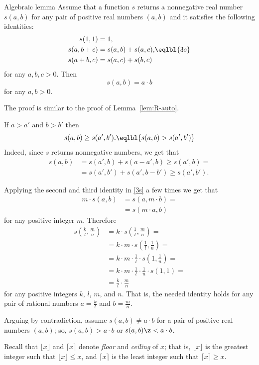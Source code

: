 \begin{thm}{Algebraic lemma}\label{lem:alg-area}
Assume that a function $s$
returns a nonnegative real number $s(a,b)$
for any pair of positive real numbers $(a,b)$
and it satisfies the following identities:
\[\begin{aligned}
s(1,1)&=1,
\\
s(a,b+c)&=s(a,b)+s(a,c),
\\
s(a+b,c)&=s(a,c)+s(b,c)
\end{aligned}
\eqlbl{3s}
\]
for any $a,b,c>0$.
Then
\[s(a,b)=a\cdot b\]
for any $a,b>0$.
\end{thm}

The proof is similar to the proof of Lemma~\ref{lem:R-auto}.

If $a>a'$ and $b>b'$ then
\[s(a,b)\ge s(a',b').\eqlbl{s(a,b)>s(a',b')}\]
Indeed, since $s$ returns nonnegative numbers, we get that
\begin{align*}
s(a,b)&=s(a',b)+s(a-a',b)\ge s(a',b)=
\\
&= s(a',b')+s(a',b-b')\ge s(a',b').
\end{align*}

Applying the second and third identity in \ref{3s} a few times we get that
\begin{align*}
m\cdot s(a,b)&=s(a,m\cdot b)=
\\&=s(m\cdot a,b)
\end{align*}
for any positive integer $m$. Therefore
\begin{align*}
s(\tfrac kl,\tfrac mn)
&=k \cdot s(\tfrac 1l,\tfrac mn)=
\\
&=k\cdot m \cdot s(\tfrac 1l,\tfrac 1n)=
\\
&=k\cdot m\cdot \tfrac 1l\cdot s(1, \tfrac 1n)=
\\
&=k\cdot m\cdot \tfrac 1l\cdot \tfrac 1n\cdot s(1,1)=
\\
&=\tfrac kl\cdot\tfrac mn
\end{align*}
for any positive integers $k$, $l$, $m$, and $n$.
That is, the needed identity holds for any pair of rational numbers $a=\tfrac kl$ and $b=\tfrac mn$.

Arguing by contradiction, assume $s(a,b)\ne a\cdot b$ for a pair of positive real numbers $(a,b)$;
so, $s(a,b)> a\cdot b$ or $s(a,b)\z< a\cdot b$.

Recall that $\lfloor x \rfloor$ and $\lceil x \rceil$  denote \emph{floor} and {}\emph{ceiling} of $x$;
that is, $\lfloor x \rfloor$ is the greatest integer such that $\lfloor x \rfloor\le x$,
and $\lceil x \rceil$ is the least integer such that $\lceil x \rceil\ge x$.


